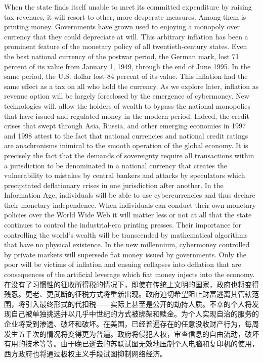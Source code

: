 \begin{paracol}{2}[]
When the state finds itself unable to meet its committed expenditure by raising tax revenues, it will resort to other, more desperate measures. Among them is printing money. Governments have grown used to enjoying a monopoly over currency that they could depreciate at will. This arbitrary inflation has been a prominent feature of the monetary policy of all twentieth-century states. Even the best national currency of the postwar period, the German mark, lost 71 percent of its value from January 1, 1949, through the end of June 1995. In the same period, the U.S. dollar lost 84 percent of its value. This inflation had the same effect as a tax on all who hold the currency. As we explore later, inflation as revenue option will be largely foreclosed by the emergence of cybermoney. New technologies will. allow the holders of wealth to bypass the national monopolies that have issued and regulated money in the modern period. Indeed, the credit crises that swept through Asia, Russia, and other emerging economies in 1997 and 1998 attest to the fact that national currencies and national credit ratings are anachronisms inimical to the smooth operation of the global economy. It is precisely the fact that the demands of sovereignty require all transactions within a jurisdiction to be denominated in a national currency that creates the vulnerability to mistakes by central bankers and attacks by speculators which precipitated deflationary crises in one jurisdiction after another. In the Information Age, individuals will be able to use cybercurrencies and thus declare their monetary independence. When individuals can conduct their own monetary policies over the World Wide Web it will matter less or not at all that the state continues to control the industrial-era printing presses. Their importance for controlling the world's wealth will be transcended by mathematical algorithms that have no physical existence. In the new millennium, cybermoney controlled by private markets will supersede fiat money issued by governments. Only the poor will be victims of inflation and ensuing collapses into deflation that are consequences of the artificial leverage which fiat money injects into the economy.
\switchcolumn*
在没有了习惯性的征收所得税的情况下，即使在传统上文明的国家，政府也将变得残忍。更老、更武断的征税方式将重新出现。政府迫切希望阻止财富逃离其管辖范围，将引入最终形式的代扣税——实际上甚至是公开的劫持人质。不幸的个人将发现自己被单独挑选并以几乎中世纪的方式被绑架和赎金。为个人实现自治的服务的企业将受到渗透、破坏和破坏。在美国，已经普遍存在的任意没收财产行为，每周发生五千次的情况将变得更为普遍。政府将侵犯人权，审查信息的自由流动，破坏有用的技术等等。由于晚已逝去的苏联试图无效地压制个人电脑和复印机的使用，西方政府也将通过极权主义手段试图抑制网络经济。

\end{paracol}
